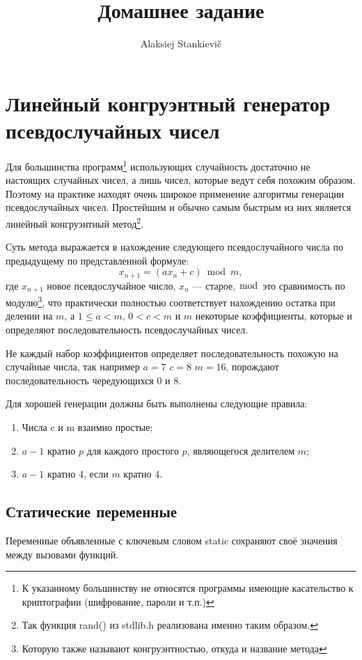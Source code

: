 \documentclass[12pt]{article}
\author{Alaksiej Stankievič}
\title{Домашнее задание}
\begin{document}

\section*{Линейный конгруэнтный генератор псевдослучайных чисел}
Для большинства программ\footnote{К указанному большинству не относятся программы имеющие касательство к криптографии (шифрование, пароли и т.п.)} использующих случайность достаточно не настоящих случайных чисел, а лишь чисел, которые ведут себя похожим образом. Поэтому на практике находят очень широкое применение алгоритмы генерации псевдослучайных чисел. Простейшим и обычно самым быстрым из них является линейный конгруэнтный метод\footnote{Так функция rand() из stdlib.h реализована именно таким образом.}.

Суть метода выражается в нахождение следующего псевдослучайного числа по предыдущему по представленной формуле:
\begin{equation}
 x_{n+1}=(a x_n + c) \bmod m,
\end{equation}
где $x_{n+1}$ новое псевдослучайное число, $x_n$ --- старое, $\bmod$ это сравнимость по модулю\footnote{Которую также называют конгруэнтностью, откуда и название метода}, что практически полностью соответствует нахождению остатка при делении на $m$, а  $1\leq{}a<m$, $0<c<m$ и $m$ некоторые коэффициенты, которые и определяют последовательность псевдослучайных чисел.

Не каждый набор коэффициентов определяет последовательность похожую на случайные числа, так например $a=7$ $c=8$ $m=16$, порождают последовательность чередующихся 0 и 8.

Для хорошей генерации должны быть выполнены следующие правила:
\begin{enumerate}
 \item Числа c и m взаимно простые;
 \item $a - 1$ кратно $p$ для каждого простого $p$, являющегося делителем $m$;
 \item $a - 1$ кратно 4, если $m$ кратно 4.
\end{enumerate}

\subsection*{Статические переменные}
Переменные объявленные с ключевым словом static сохраняют своё значения между вызовами функций.
\end{document}
